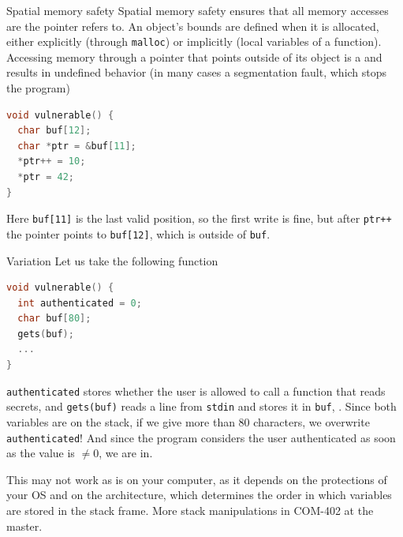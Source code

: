 \begin{parag}{Spatial memory safety}
    Spatial memory safety ensures that all memory accesses are  the pointer refers to. An object's bounds are defined when it is allocated, either explicitly (through \texttt{malloc}) or implicitly (local variables of a function). Accessing memory through a pointer that points outside of its object is a  and results in undefined behavior (in many cases a segmentation fault, which stops the program)
    \begin{lstlisting}[language=C]
void vulnerable() {
  char buf[12];
  char *ptr = &buf[11];
  *ptr++ = 10;
  *ptr = 42;
}
    \end{lstlisting}
    Here \texttt{buf[11]} is the last valid position, so the first write is fine, but after \texttt{ptr++} the pointer points to \texttt{buf[12]}, which is outside of \texttt{buf}.
    \begin{subparag}{Variation}
        Let us take the following function
        \begin{lstlisting}[language=C]
void vulnerable() {
  int authenticated = 0;
  char buf[80];
  gets(buf);
  ...
}
        \end{lstlisting}
        \texttt{authenticated} stores whether the user is allowed to call a function that reads secrets, and \texttt{gets(buf)} reads a line from \texttt{stdin} and stores it in \texttt{buf}, . Since both variables are on the stack, if we give more than 80 characters, we overwrite \texttt{authenticated}! And since the program considers the user authenticated as soon as the value is $\neq 0$, we are in.
    \end{subparag}
\end{parag}

\begin{framedremark}
    This may not work as is on your computer, as it depends on the protections of your OS and on the architecture, which determines the order in which variables are stored in the stack frame. More stack manipulations in COM-402 at the master.
\end{framedremark}

